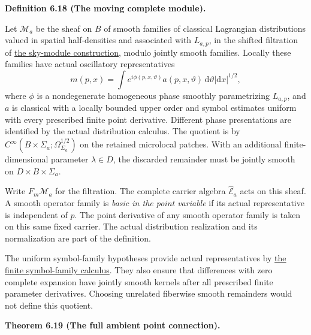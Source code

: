 \documentclass[
  english,
  11pt,
  reqno]{amsart}
\makeatletter
\newcommand{\pandocstatementheading}[1]{%
  \par\if@nobreak\else
    \addpenalty{\@beginparpenalty}%
    \addvspace{.5\baselineskip plus .2\baselineskip minus .2\baselineskip}%
  \fi
  {\normalfont\bfseries #1\par}%
  \nobreak\@afterindenttrue\@afterheading
}
\makeatother
\begin{document}
\pandocstatementheading{\leavevmode{}\label{def:online-moving-wave-module}Definition 6.18 (The moving complete module).}

Let \(\mathscr M_a\) be the sheaf on \(B\) of smooth families of
classical Lagrangian distributions valued in spatial half-densities and
associated with \(L_{a,p}\), in the shifted filtration of
\hyperref[prop:online-shifted-sky-modules]{the sky-module construction},
modulo jointly smooth families. Locally these families have actual
oscillatory representatives%
 \[
m(p,x)=\int e^{i\phi(p,x,\vartheta)}
          a(p,x,\vartheta)\,\mathrm d\vartheta
          |\mathrm dx|^{1/2},
\] where \(\phi\) is a nondegenerate homogeneous phase smoothly
parametrizing \(L_{a,p}\), and \(a\) is classical with a locally bounded
upper order and symbol estimates uniform with every prescribed finite
point derivative. Different phase presentations are identified by the
actual distribution calculus. The quotient is by
\(C^\infty(B\times\Sigma_a;\Omega_{\Sigma_a}^{1/2})\) on the retained
microlocal patches. With an additional finite-dimensional parameter
\(\lambda\in D\), the discarded remainder must be jointly smooth on
\(D\times B\times\Sigma_a\).

Write \(F_m\mathscr M_a\) for the filtration. The complete carrier
algebra \(\widehat{\mathscr E}_a\) acts on this sheaf. A smooth operator
family is \emph{basic in the point variable} if its actual
representative is independent of \(p\). The point derivative of any
smooth operator family is taken on this same fixed carrier. The actual
distribution realization and its normalization are part of the
definition.

The uniform symbol-family hypotheses provide actual representatives by
\hyperref[lem:online-finite-symbol-family-calculus]{the finite
symbol-family calculus}. They also ensure that differences with zero
complete expansion have jointly smooth kernels after all prescribed
finite parameter derivatives. Choosing unrelated fiberwise smooth
remainders would not define this quotient.

\pandocstatementheading{\leavevmode{}\label{thm:online-ambient-point-connection}Theorem 6.19 (The full ambient point connection).}
\end{document}
